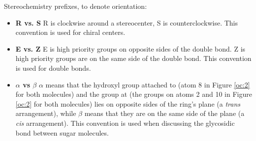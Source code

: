 \documentclass{article}
\theoremstyle{plain}%
\theoremstyle{definition}
\theoremstyle{remark}
\begin{document}
\indent Stereochemistry prefixes, to denote orientation:
\begin{itemize}
\item \textbf{R vs. S} R is clockwise around a stereocenter, S is counterclockwise. This convention is used for chiral centers.
\item \textbf{E vs. Z} E is high priority groups on opposite sides of the double bond. Z is high priority groups are on the same side of the double bond. This convention is used for double bonds.
\item \textbf{$\alpha$ vs $\beta$} $\alpha$ means that the hydroxyl group attached to  (atom 8 in Figure \ref{oc:2} for both molecules) and the  group at  (the groups on atoms 2 and 10 in Figure \ref{oc:2} for both molecules) lies on opposite sides of the ring's plane (a \textit{trans} arrangement), while $\beta$ means that they are on the same side of the plane (a \textit{cis} arrangement). This convention is used when discussing the glycosidic bond between sugar molecules. 
\end{itemize}
\end{document}
